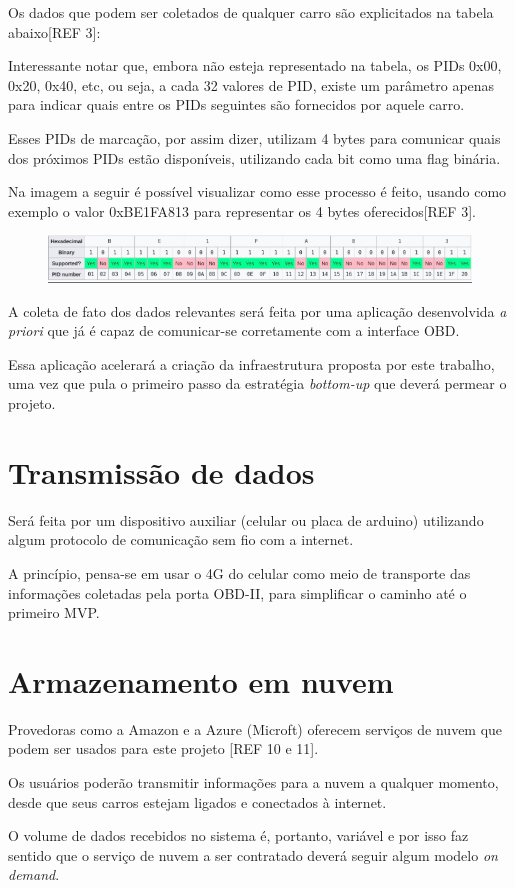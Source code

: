 Os dados que podem ser coletados de qualquer carro são explicitados na tabela abaixo[REF 3]:



Interessante notar que, embora não esteja representado na tabela, os PIDs 0x00, 0x20, 0x40, etc, ou seja, a cada 32 valores de PID, existe um parâmetro apenas para indicar quais entre os PIDs seguintes são fornecidos por aquele carro.

Esses PIDs de marcação, por assim dizer, utilizam 4 bytes para comunicar quais dos próximos PIDs estão disponíveis, utilizando cada bit como uma flag binária. 

Na imagem a seguir é possível visualizar como esse processo é feito, usando como exemplo o valor 0xBE1FA813 para representar os 4 bytes oferecidos[REF 3].

\begin{figure}[hp]
    \centering
    
    \includegraphics[scale=0.7]{figures/tabela_dados_disponiveis.png}
    
    \caption{}
\end{figure}

A coleta de fato dos dados relevantes será feita por uma aplicação desenvolvida \textit{a priori} que já é capaz de comunicar-se corretamente com a interface OBD.

Essa aplicação acelerará a criação da infraestrutura proposta por este trabalho, uma vez que pula o primeiro passo da estratégia \textit{bottom-up} que deverá permear o projeto.

\section{Transmissão de dados}
Será feita por um dispositivo auxiliar (celular ou placa de arduino) utilizando algum protocolo de comunicação sem fio com a internet.

A princípio, pensa-se em usar o 4G do celular como meio de transporte das informações coletadas pela porta OBD-II, para simplificar o caminho até o primeiro MVP.

\section{Armazenamento em nuvem}
Provedoras como a Amazon e a Azure (Microft) oferecem serviços de nuvem que podem ser usados para este projeto [REF 10 e 11].

Os usuários poderão transmitir informações para a nuvem a qualquer momento, desde que seus carros estejam ligados e conectados à internet.

O volume de dados recebidos no sistema é, portanto, variável e por isso faz sentido que o serviço de nuvem a ser contratado deverá seguir algum modelo \textit{on demand}.
